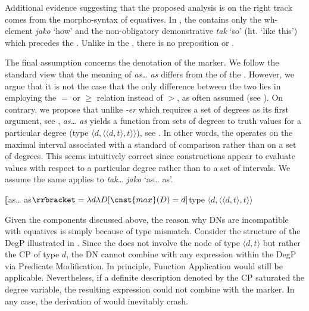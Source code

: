 \documentclass[output=paper,modfonts,hidelinks,newtxmath
\ChapterDOI{10.5281/zenodo.2545513}
]{langscibook}
\begin{document}
\noindent Additional evidence suggesting that the proposed analysis is on the right track comes from the morpho-syntax of  equatives. In , the  contains only the wh-element \textit{jako} `how' and the non-obligatory demonstrative  \textit{tak} `so' (lit. `like this') which precedes the . Unlike in the , there is no preposition or . 

The final assumption concerns the denotation of the  marker. We follow the standard view that the meaning of \textit{as\dots{} as} differs from the  of the . However, we argue that it is not the case that the only difference between the two lies in employing the $=$ or $\geq$ relation instead of $>$, as often assumed (see \citealt{rett_measure_2015}). On contrary, we propose that unlike \textit{-er} which requires a set of degrees as its first argument, see , \textit{as\dots{} as} yields a function from sets of degrees to truth values for a particular degree (type $\langle d,\langle \langle d,t\rangle,t\rangle\rangle$), see . In other words, the  operates on the maximal interval associated with a standard of comparison rather than on a set of degrees. This seems intuitively correct since  constructions appear to evaluate values with respect to a particular degree rather than to a set of intervals. We assume the same applies to  \textit{tak\dots{} jako} `as\dots{} as'.

\ea $\llbracket$as{\dots} as$\rrbracket = \lambda d\lambda D[\cnst{max}(D) = d]$\hfill type $\langle d,\langle \langle d,t\rangle,t\rangle\rangle$\label{as-as-semantics}
\z

\noindent Given the components discussed above, the reason why DNs are incompatible with equatives is simply because of type mismatch. Consider the structure of the DegP illustrated in . Since the  does not involve the node of type $\langle d,t\rangle$ but rather the CP of type $d$, the DN cannot combine with any expression within the DegP via Predicate Modification. In principle, Function Application would still be applicable. Nevertheless, if a definite description denoted by the CP saturated the degree variable, the resulting expression could not combine with the  marker. In any case, the derivation of  would inevitably crash.

\end{document}
